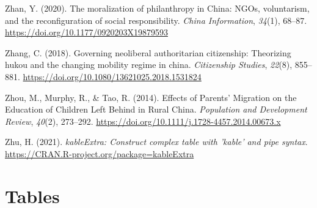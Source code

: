 \documentclass[
  man,floatsintext]{apa7}
\newlength{\cslhangindent}
\newlength{\cslentryspacingunit} %
\newenvironment{CSLReferences}[2] %
 {%
  \setlength{\parindent}{0pt}
  \ifodd #1
  \let\oldpar\par
  \def\par{\hangindent=\cslhangindent\oldpar}
  \fi
  \setlength{\parskip}{#2\cslentryspacingunit}
 }%
 {}
\begin{document}
\begin{CSLReferences}{1}{0}
\leavevmode{}%
Zhan, Y. (2020). The moralization of philanthropy in China: NGOs, voluntarism, and the reconfiguration of social responsibility. \emph{China Information}, \emph{34}(1), 68--87. \url{https://doi.org/10.1177/0920203X19879593}

\leavevmode{}%
Zhang, C. (2018). Governing neoliberal authoritarian citizenship: Theorizing hukou and the changing mobility regime in china. \emph{Citizenship Studies}, \emph{22}(8), 855--881. \url{https://doi.org/10.1080/13621025.2018.1531824}

\leavevmode{}%
Zhou, M., Murphy, R., \& Tao, R. (2014). Effects of Parents' Migration on the Education of Children Left Behind in Rural China. \emph{Population and Development Review}, \emph{40}(2), 273--292. \url{https://doi.org/10.1111/j.1728-4457.2014.00673.x}

\leavevmode{}%
Zhu, H. (2021). \emph{kableExtra: Construct complex table with 'kable' and pipe syntax}. \url{https://CRAN.R-project.org/package=kableExtra}

\end{CSLReferences}

\newpage

\hypertarget{appendix-the-appendix}{%
\appendix}


\hypertarget{tables}{%
\section{Tables}\label{tables}}
\end{document}
